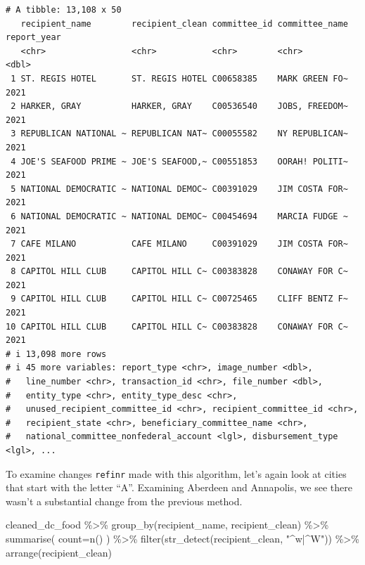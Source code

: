 \documentclass[
  letterpaper,
  DIV=11,
  numbers=noendperiod]{scrreprt}
\newenvironment{Shaded}{\begin{snugshade}}{\end{snugshade}}
\newcommand{\AttributeTok}[1]{\textcolor[rgb]{0.40,0.45,0.13}{#1}}
\newcommand{\FunctionTok}[1]{\textcolor[rgb]{0.28,0.35,0.67}{#1}}
\newcommand{\NormalTok}[1]{\textcolor[rgb]{0.00,0.23,0.31}{#1}}
\newcommand{\SpecialCharTok}[1]{\textcolor[rgb]{0.37,0.37,0.37}{#1}}
\newcommand{\StringTok}[1]{\textcolor[rgb]{0.13,0.47,0.30}{#1}}
\begin{document}
\begin{verbatim}
# A tibble: 13,108 x 50
   recipient_name        recipient_clean committee_id committee_name report_year
   <chr>                 <chr>           <chr>        <chr>                <dbl>
 1 ST. REGIS HOTEL       ST. REGIS HOTEL C00658385    MARK GREEN FO~        2021
 2 HARKER, GRAY          HARKER, GRAY    C00536540    JOBS, FREEDOM~        2021
 3 REPUBLICAN NATIONAL ~ REPUBLICAN NAT~ C00055582    NY REPUBLICAN~        2021
 4 JOE'S SEAFOOD PRIME ~ JOE'S SEAFOOD,~ C00551853    OORAH! POLITI~        2021
 5 NATIONAL DEMOCRATIC ~ NATIONAL DEMOC~ C00391029    JIM COSTA FOR~        2021
 6 NATIONAL DEMOCRATIC ~ NATIONAL DEMOC~ C00454694    MARCIA FUDGE ~        2021
 7 CAFE MILANO           CAFE MILANO     C00391029    JIM COSTA FOR~        2021
 8 CAPITOL HILL CLUB     CAPITOL HILL C~ C00383828    CONAWAY FOR C~        2021
 9 CAPITOL HILL CLUB     CAPITOL HILL C~ C00725465    CLIFF BENTZ F~        2021
10 CAPITOL HILL CLUB     CAPITOL HILL C~ C00383828    CONAWAY FOR C~        2021
# i 13,098 more rows
# i 45 more variables: report_type <chr>, image_number <dbl>,
#   line_number <chr>, transaction_id <chr>, file_number <dbl>,
#   entity_type <chr>, entity_type_desc <chr>,
#   unused_recipient_committee_id <chr>, recipient_committee_id <chr>,
#   recipient_state <chr>, beneficiary_committee_name <chr>,
#   national_committee_nonfederal_account <lgl>, disbursement_type <lgl>, ...
\end{verbatim}

To examine changes \texttt{refinr} made with this algorithm, let's again
look at cities that start with the letter ``A''. Examining Aberdeen and
Annapolis, we see there wasn't a substantial change from the previous
method.

\begin{Shaded}
\begin{Highlighting}[]
\NormalTok{cleaned\_dc\_food }\SpecialCharTok{\%\textgreater{}\%}
  \FunctionTok{group\_by}\NormalTok{(recipient\_name, recipient\_clean) }\SpecialCharTok{\%\textgreater{}\%}
  \FunctionTok{summarise}\NormalTok{(}
    \AttributeTok{count=}\FunctionTok{n}\NormalTok{()}
\NormalTok{  ) }\SpecialCharTok{\%\textgreater{}\%}
  \FunctionTok{filter}\NormalTok{(}\FunctionTok{str\_detect}\NormalTok{(recipient\_clean, }\StringTok{"\^{}w|\^{}W"}\NormalTok{)) }\SpecialCharTok{\%\textgreater{}\%}
  \FunctionTok{arrange}\NormalTok{(recipient\_clean)}
\end{Highlighting}
\end{Shaded}
\end{document}
